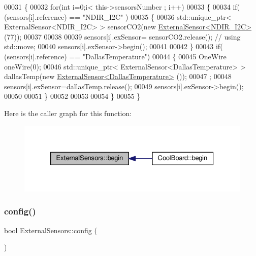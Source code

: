 \begin{DoxyCode}
00031 \{
00032     \textcolor{keywordflow}{for}(\textcolor{keywordtype}{int} i=0;i< this->sensorsNumber ; i++)
00033     \{
00034         \textcolor{keywordflow}{if}( (sensors[i].reference) == \textcolor{stringliteral}{"NDIR\_I2C"} )
00035         \{   
00036             std::unique\_ptr< ExternalSensor<NDIR\_I2C> > sensorCO2(\textcolor{keyword}{new} 
      \hyperlink{class_external_sensor_3_01_n_d_i_r___i2_c_01_4}{ExternalSensor<NDIR\_I2C>} (77));
00037 
00038 
00039             sensors[i].exSensor= sensorCO2.release();                       \textcolor{comment}{// using std::move;}
00040             sensors[i].exSensor->begin();
00041 
00042         \}
00043         \textcolor{keywordflow}{if}( (sensors[i].reference) == \textcolor{stringliteral}{"DallasTemperature"})
00044         \{
00045             OneWire oneWire(0);
00046             std::unique\_ptr< ExternalSensor<DallasTemperature> > dallasTemp(\textcolor{keyword}{new} 
      \hyperlink{class_external_sensor_3_01_dallas_temperature_01_4}{ExternalSensor<DallasTemperature>} ());
00047              ;
00048             sensors[i].exSensor=dallasTemp.release();
00049             sensors[i].exSensor->begin();
00050             
00051         \}
00052         
00053         
00054     \}
00055 \}
\end{DoxyCode}
Here is the caller graph for this function\+:\nopagebreak
\begin{figure}[H]
\begin{center}
\leavevmode
\includegraphics[width=326pt]{class_external_sensors_a58ede0d786a86417254708870f04a21e_icgraph}
\end{center}
\end{figure}
\mbox{\label{class_external_sensors_a862a4bd11346b37270d0244c2adabe5a}} 
\subsubsection{\texorpdfstring{config()}{config()}}
{\footnotesize\ttfamily bool External\+Sensors\+::config (\begin{DoxyParamCaption}{ }\end{DoxyParamCaption})}

